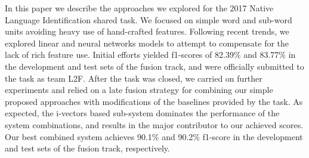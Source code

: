 In this paper we describe the approaches we explored for the 2017 Native Language Identification shared task. We focused on simple word and sub-word units avoiding heavy use of hand-crafted features. Following recent trends, we explored linear and neural networks models to attempt to compensate for the lack of rich feature use. Initial efforts yielded f1-scores of 82.39\% and 83.77\% in the development and test sets of the fusion track, and were officially submitted to the task as team L2F. After the task was closed, we carried on further experiments and relied on a late fusion strategy for combining our simple proposed approaches with modifications of the baselines provided by the task. As expected, the i-vectors based sub-system dominates the performance of the system combinations, and results in the major contributor to our achieved scores. Our best combined system achieves 90.1\% and 90.2\% f1-score in the development and test sets of the fusion track, respectively.
